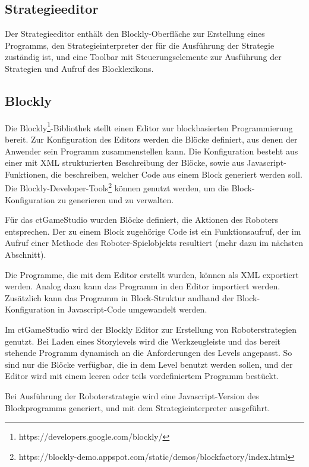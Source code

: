 \subsection{Strategieeditor}

Der Strategieeditor enthält den Blockly-Oberfläche zur Erstellung eines Programms, den
Strategieinterpreter der für die Ausführung der Strategie zuständig ist, und eine Toolbar mit
Steuerungselemente zur Ausführung der Strategien und Aufruf des Blocklexikons.

\subsection{Blockly}

Die Blockly\footnote{https://developers.google.com/blockly/}-Bibliothek stellt einen Editor zur
blockbasierten Programmierung bereit. Zur Konfiguration des Editors werden die Blöcke
definiert, aus denen der Anwender sein Programm zusammenstellen kann. Die Konfiguration besteht aus
einer mit XML strukturierten Beschreibung der Blöcke, sowie aus Javascript-Funktionen, die
beschreiben, welcher Code aus einem Block generiert werden soll.  Die
Blockly-Developer-Tools\footnote{https://blockly-demo.appspot.com/static/demos/blockfactory/index.html}
können genutzt werden, um die Block-Konfiguration zu generieren und zu verwalten.

Für das ctGameStudio wurden Blöcke definiert, die Aktionen des Roboters entsprechen. Der zu einem
Block zugehörige Code ist ein Funktionsaufruf, der im Aufruf einer Methode des Roboter-Spielobjekts
resultiert (mehr dazu im nächsten Abschnitt).

Die Programme, die mit dem Editor erstellt wurden, können als XML exportiert werden. Analog dazu
kann das Programm in den Editor importiert werden. Zusätzlich kann das Programm in Block-Struktur
andhand der Block-Konfiguration in Javascript-Code umgewandelt werden.

Im ctGameStudio wird der Blockly Editor zur Erstellung von Roboterstrategien genutzt. Bei Laden
eines Storylevels wird die Werkzeugleiste und das bereit stehende Programm dynamisch an die
Anforderungen des Levels angepasst. So sind nur die Blöcke verfügbar, die in dem Level benutzt
werden sollen, und der Editor wird mit einem leeren oder teils vordefiniertem Programm bestückt.

Bei Ausführung der Roboterstrategie wird eine Javascript-Version des Blockprogramms generiert, und
mit dem Strategieinterpreter ausgeführt.


